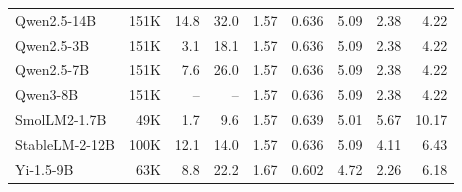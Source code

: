 \begin{table}[t]
\begin{tabular}{lrrrrrrrr}
Qwen2.5-14B            & 151K &  14.8 &  32.0 & 1.57 & 0.636 & 5.09 & 2.38 & 4.22 \\
Qwen2.5-3B             & 151K &   3.1 &  18.1 & 1.57 & 0.636 & 5.09 & 2.38 & 4.22 \\
Qwen2.5-7B             & 151K &   7.6 &  26.0 & 1.57 & 0.636 & 5.09 & 2.38 & 4.22 \\
Qwen3-8B               & 151K &    -- &    -- & 1.57 & 0.636 & 5.09 & 2.38 & 4.22 \\
SmolLM2-1.7B           &  49K &   1.7 &   9.6 & 1.57 & 0.639 & 5.01 & 5.67 & 10.17 \\
StableLM-2-12B         & 100K &  12.1 &  14.0 & 1.57 & 0.636 & 5.09 & 4.11 & 6.43 \\
Yi-1.5-9B              &  63K &   8.8 &  22.2 & 1.67 & 0.602 & 4.72 & 2.26 & 6.18 \\
\bottomrule
\end{tabular}
\end{table}
